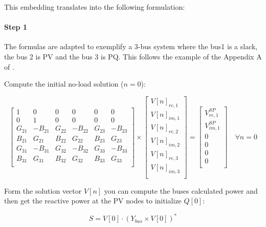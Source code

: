\documentclass[nols,a4paper,twoside,symmetric,notoc,fleqn]{tufte-book}
\begin{document}
This embedding translates into the following formulation:

\paragraph{Step 1}

The formulas are adapted to exemplify a 3-bus system where the bus1 is a slack, the bus 2 is PV and the bus 3 is PQ. This follows the example of the Appendix A of \cite{liu2017online}.

\vspace{1cm}

Compute the initial no-load solution ($n=0$):

\begin{equation}
\begin{bmatrix}
1 & 0 & 0 & 0 & 0 & 0\\
0 & 1 & 0 & 0 & 0 & 0\\
G_{21} & -B_{21} & G_{22} & -B_{22} & G_{23} & -B_{23}\\
B_{21} & G_{21}  & B_{22} & G_{22}  & B_{23} & G_{23}\\
G_{31} & -B_{31} & G_{32} & -B_{32} & G_{33} & -B_{33}\\
B_{31} & G_{31}  & B_{32} & G_{32}  & B_{33} & G_{33}\\
\end{bmatrix}
\times
\begin{bmatrix}
V[n]_{re, 1}\\
V[n]_{im, 1}\\
V[n]_{re, 2}\\
V[n]_{im, 2}\\
V[n]_{re, 3}\\
V[n]_{im, 3}\\
\end{bmatrix}
=
\begin{bmatrix}
V^{SP}_{re, 1}\\
V^{SP}_{im, 1}\\
0\\
0\\
0\\
0\\
\end{bmatrix}
\quad \forall n = 0
\end{equation}

Form the solution vector ${V}[n]$ you can compute the buses calculated power and then get the reactive power at the PV nodes to initialize ${Q}[0]$:

\begin{equation}
{S} = {V}[0] \cdot ({Y}_{bus} \times {V}[0])^*
\label{Scalc}
\end{equation}
\end{document}
